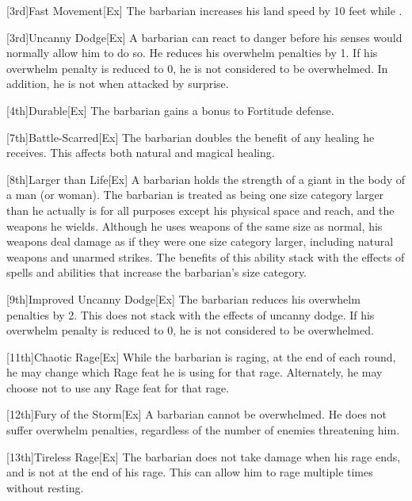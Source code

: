         [3rd]{Fast Movement}[Ex]
        The barbarian increases his land speed by 10 feet while \unencumbered.

        [3rd]{Uncanny Dodge}[Ex]
        A barbarian can react to danger before his senses would normally allow him to do so.
        He reduces his overwhelm penalties by 1.
        If his overwhelm penalty is reduced to 0, he is not considered to be overwhelmed.
        In addition, he is not \unaware when attacked by surprise.

        [4th]{Durable}[Ex]
        The barbarian gains a  bonus to Fortitude defense.

        [7th]{Battle-Scarred}[Ex]
        The barbarian doubles the benefit of any healing he receives.
        This affects both natural and magical healing.

        [8th]{Larger than Life}[Ex]
        A barbarian holds the strength of a giant in the body of a man (or woman).
        The barbarian is treated as being one size category larger than he actually is for all purposes except his physical space and reach, and the weapons he wields.
        Although he uses weapons of the same size as normal, his weapons deal damage as if they were one size category larger, including natural weapons and unarmed strikes.
        The benefits of this ability stack with the effects of spells and abilities that increase the barbarian's size category.

        [9th]{Improved Uncanny Dodge}[Ex]
        The barbarian reduces his overwhelm penalties by 2.
        This does not stack with the effects of uncanny dodge.
        If his overwhelm penalty is reduced to 0, he is not considered to be overwhelmed.

        [11th]{Chaotic Rage}[Ex]
        While the barbarian is raging, at the end of each round, he may change which Rage feat he is using for that rage.
        Alternately, he may choose not to use any Rage feat for that rage.

        [12th]{Fury of the Storm}[Ex]
        A barbarian cannot be overwhelmed.
        He does not suffer overwhelm penalties, regardless of the number of enemies threatening him.

        [13th]{Tireless Rage}[Ex]
        The barbarian does not take damage when his rage ends, and is not \fatigued at the end of his rage.
        This can allow him to rage multiple times without resting.

